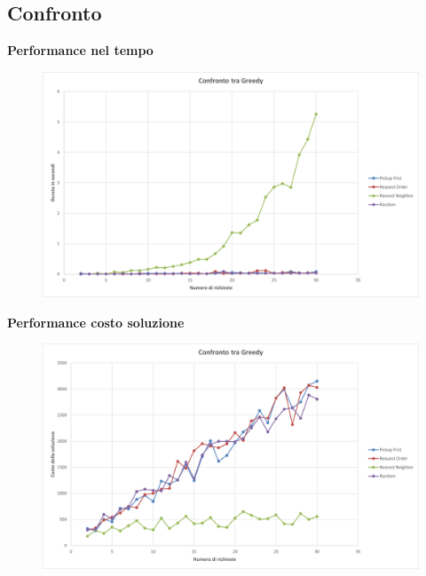 \documentclass[9pt]{beamer}
\begin{document}
\subsection{Confronto}
\begin{frame}[allowframebreaks]{\subsecname}

	\textbf{Performance nel tempo}
      	\begin{figure}[h]
	\centering
	\includegraphics[width=\textwidth]
	{../charts/08a Confronto tra Greedy}
	\end{figure}

\framebreak

	\textbf{Performance costo soluzione}
      	\begin{figure}[h]
	\centering
	\includegraphics[width=\textwidth]
	{../charts/08b Confronto tra Greedy}
	\end{figure}

\framebreak


\end{frame}
\end{document}
